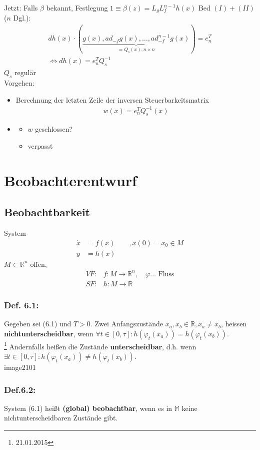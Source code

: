 \documentclass[ngerman]{tudscrreprt}
\begin{document}
Jetzt: Falls $\beta$ bekannt, Festlegung $1 \equiv \beta(z) = L_gL_f^{n-1} h(x)$ Bed $(I) + (II) $ ($n$ Dgl.): 
\begin{align*}
dh(x)\cdot (\underbrace{g(x), ad_{-f}g(x), \dots, ad_{-f}^{n-1} g(x)}_{=Q_s (x), n\times n})= e_n^T\\ 
\iff dh(x) =  e_n^T Q_s^{-1} 
\end{align*}$Q_s$ regulär\\ 
Vorgehen: 
\begin{itemize}
\item Berechnung der letzten Zeile der inversen Steuerbarkeitsmatrix \begin{align*} w(x) = e_n^T Q_s^{-1}(x)\end{align*} 
\item \begin{itemize}
\item $w$ geschlossen? 
\item verpasst
\end{itemize}
\end{itemize}
\chapter{Beobachterentwurf}
\section{Beobachtbarkeit}
System 
\begin{align*}
\dot x &= f(x)\qquad, x(0) = x_0 \in M\\ 
y &= h(x) \tag{6.1}
\end{align*}
$M \subset \mathbb{R}^n $ offen, \begin{align*}
VF: &f:M\to \mathbb{R}^n, \quad \varphi \dots \text{ Fluss}\\ 
SF: &h:M\to \mathbb{R}
\end{align*}
\subsection*{Def. 6.1:}Gegeben sei (6.1) und $T>0$. Zwei Anfangszustände $x_a, x_b \in \mathbb{R}, x_a\ne x_b$, heissen \textbf{nichtunterscheidbar}, wenn $\forall t\in [0, \tau]: h(\varphi_t(x_a)) = h(\varphi_t(x_b))$.\\
\footnote{21.01.2015}
Andernfalls heißen die Zustände \textbf{unterscheidbar}, d.h. wenn $\exists t\in [0, \tau]: h(\varphi_t(x_a))\ne h(\varphi_t(x_b)).$\\ 
image2101
\subsection*{Def.6.2:}System (6.1) heißt \textbf{(global) beobachtbar}, wenn es in $\mathbb{M}$ keine nichtunterscheidbaren Zustände gibt. 
\end{document}
